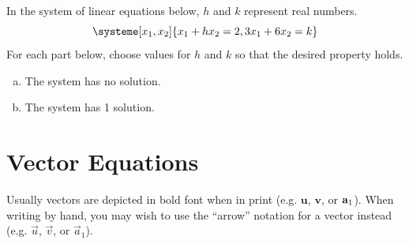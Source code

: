 \begin{exercise} %
In the system of linear equations below, $h$ and $k$ represent real numbers.
\[\systeme[x_1,x_2]{
	 x_1	+	hx_2	= 2,
	3x_1	+	6x_2	= k
	}
\]
For each part below, choose values for $h$ and $k$ so that the desired property holds.
\begin{multicols}{2}
	\begin{enumerate}[(a)]
		\item The system has no solution.
		\item The system has 1 solution.
	\end{enumerate}
\end{multicols}
\end{exercise}
\vfill


\newpage


\section{Vector Equations}
\name

\begin{boxme}
Usually vectors are depicted in bold font when in print (e.g. $\textbf{u}$, $\textbf{v}$, or $\boldsymbol{\mathbf{a}}_1$). When writing by hand, you may wish to use the ``arrow'' notation for a vector instead (e.g. $\vec{u}$, $\vec{v}$, or $\vec{a}_1$).
\end{boxme}


